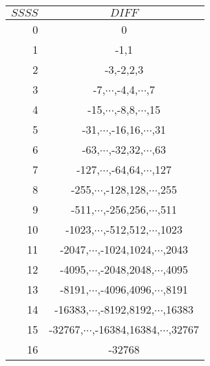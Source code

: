   \begin{tabular}{|r|c|}
    \hline
    $SSSS$ & $DIFF$ \\
    \hline
    0 &                       0 \\
    1 &                     -1,1 \\
    2 &                  -3,-2,2,3 \\
    3 &         -7,$\cdots$,-4,4,$\cdots$,7 \\
    4 &        -15,$\cdots$,-8,8,$\cdots$,15 \\
    5 &       -31,$\cdots$,-16,16,$\cdots$,31 \\
    6 &       -63,$\cdots$,-32,32,$\cdots$,63 \\
    7 &      -127,$\cdots$,-64,64,$\cdots$,127 \\
    8 &     -255,$\cdots$,-128,128,$\cdots$,255 \\
    9 &     -511,$\cdots$,-256,256,$\cdots$,511 \\
    10 &    -1023,$\cdots$,-512,512,$\cdots$,1023 \\
    11 &   -2047,$\cdots$,-1024,1024,$\cdots$,2043 \\
    12 &   -4095,$\cdots$,-2048,2048,$\cdots$,4095 \\
    13 &   -8191,$\cdots$,-4096,4096,$\cdots$,8191 \\
    14 &  -16383,$\cdots$,-8192,8192,$\cdots$,16383 \\
    15 & -32767,$\cdots$,-16384,16384,$\cdots$,32767 \\
    16 &                    -32768 \\
    \hline
  \end{tabular}
